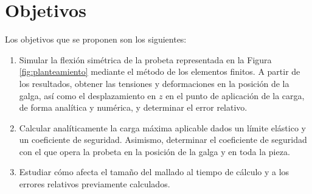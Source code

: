 
\section{Objetivos}

\noindent
Los objetivos que se proponen son los siguientes:
\begin{enumerate}
    \item Simular la flexión simétrica de la probeta representada en la Figura \ref{fig:planteamiento} mediante el método de los elementos finitos. A partir de los resultados, obtener las tensiones y deformaciones en la posición de la galga, así como el desplazamiento en $z$ en el punto de aplicación de la carga, de forma analítica y numérica, y determinar el error relativo.
    \item Calcular analíticamente la carga máxima aplicable dados un límite elástico y un coeficiente de seguridad. Asimismo, determinar el coeficiente de seguridad con el que opera la probeta en la posición de la galga y en toda la pieza.
    \item Estudiar cómo afecta el tamaño del mallado al tiempo de cálculo y a los errores relativos previamente calculados.
\end{enumerate}



